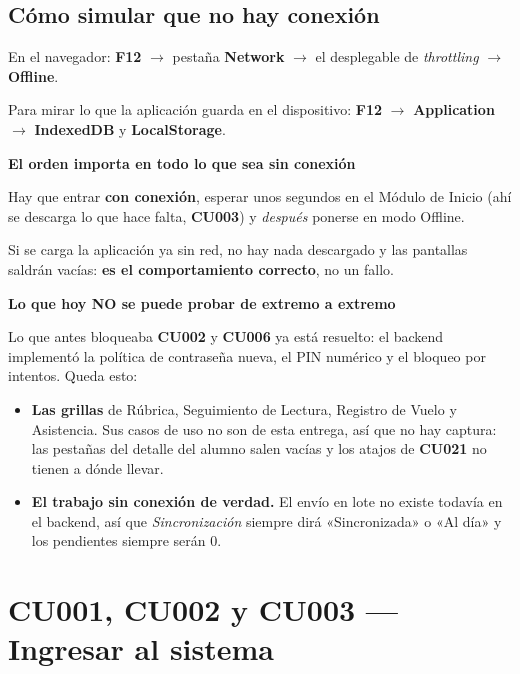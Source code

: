\documentclass[11pt,a4paper]{article}
\newcommand{\flecha}{$\rightarrow$}
\newcommand{\cu}[1]{\textbf{CU#1}}
\newenvironment{aviso}[1]
  {\par\medskip\noindent
   \begin{lrbox}{\cajaaviso}
   \begin{minipage}{\dimexpr\textwidth-2\fboxsep-2\fboxrule\relax}
   \smallskip
   \textbf{\textcolor{ambar}{#1}}\par\smallskip}
  {\smallskip\end{minipage}\end{lrbox}%
   \fcolorbox{ambar}{grisclaro}{\usebox{\cajaaviso}}\par\medskip}
\newenvironment{bloqueo}[1]
  {\par\medskip\noindent
   \begin{lrbox}{\cajabloqueo}
   \begin{minipage}{\dimexpr\textwidth-2\fboxsep-2\fboxrule\relax}
   \smallskip
   \textbf{\textcolor{rojo}{#1}}\par\smallskip}
  {\smallskip\end{minipage}\end{lrbox}%
   \fcolorbox{rojo}{white}{\usebox{\cajabloqueo}}\par\medskip}
\begin{document}
\subsection{Cómo simular que no hay conexión}

En el navegador: \textbf{F12} \flecha{} pestaña \textbf{Network} \flecha{} el
desplegable de \emph{throttling} \flecha{} \textbf{Offline}.

Para mirar lo que la aplicación guarda en el dispositivo:
\textbf{F12} \flecha{} \textbf{Application} \flecha{} \textbf{IndexedDB} y
\textbf{LocalStorage}.

\begin{aviso}{El orden importa en todo lo que sea sin conexión}
Hay que entrar \textbf{con conexión}, esperar unos segundos en el Módulo de
Inicio (ahí se descarga lo que hace falta, \cu{003}) y \emph{después} ponerse en
modo Offline.

Si se carga la aplicación ya sin red, no hay nada descargado y las pantallas
saldrán vacías: \textbf{es el comportamiento correcto}, no un fallo.
\end{aviso}

\begin{bloqueo}{Lo que hoy NO se puede probar de extremo a extremo}
Lo que antes bloqueaba \cu{002} y \cu{006} ya está resuelto: el backend
implementó la política de contraseña nueva, el PIN numérico y el bloqueo por
intentos. Queda esto:

\begin{itemize}
  \item \textbf{Las grillas} de Rúbrica, Seguimiento de Lectura, Registro de
        Vuelo y Asistencia. Sus casos de uso no son de esta entrega, así que no
        hay captura: las pestañas del detalle del alumno salen vacías y los
        atajos de \cu{021} no tienen a dónde llevar.
  \item \textbf{El trabajo sin conexión de verdad.} El envío en lote no existe
        todavía en el backend, así que \emph{Sincronización} siempre dirá
        «Sincronizada» o «Al día» y los pendientes siempre serán 0.
\end{itemize}
\end{bloqueo}

\newpage
\section{CU001, CU002 y CU003 --- Ingresar al sistema}
\end{document}
